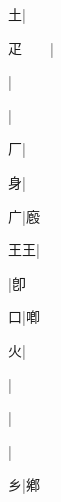 \begin{multicols}{2}
{{\cjk{}{\cnsym{}　}{\cnsym{}　}土}|{}\par
{\cjk{}疋{\cnsym{}　}{\cnsym{}　}}|{}\par
{\cjk{}{\cnsym{}　}{\cnsym{}　}{\cnsym{}　}}|{}\par
{\cjk{}{\cnsym{}　}{\cnsym{}　}{\cnsym{}　}}|{}\par
{\cjk{}{\cnsym{}　}{\cnsym{}　}厂}|{}\par
{\cjk{}{\cnsym{}　}{\cnsym{}　}身}|{}\par
{\cjk{}{\cnsym{}　}{\cnsym{}　}广}|{\cjk{}廏}\par
{\cjk{}{\cnsym{}　}王王}|{}\par
{\cjk{}{\cnsym{}　}{\cnsym{}　}{\cnsym{}　}}|{\cjk{}卽}\par
{\cjk{}{\cnsym{}　}{\cnsym{}　}口}|{\cjk{}喞}\par
{\cjk{}{\cnsym{}　}{\cnsym{}　}火}|{}\par
{\cjk{}{\cnsym{}　}{\cnsym{}　}{\cnsym{}　}}|{}\par
{\cjk{}{\cnsym{}　}{\cnsym{}　}{\cnsym{}　}}|{}\par
{}|{}\par
{\cjk{}{\cnsym{}　}{\cnsym{}　}乡}|{\cjk{}鄕}\par
}
\end{multicols}
